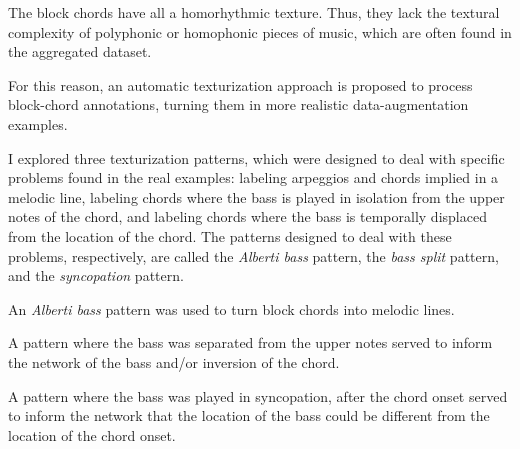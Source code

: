 
The block chords have all a homorhythmic texture. Thus, they
lack the textural complexity of polyphonic or homophonic
pieces of music, which are often found in the aggregated
dataset.

For this reason, an automatic texturization approach is
proposed to process block-chord annotations, turning them in
more realistic data-augmentation examples.

I explored three texturization patterns, which were designed
to deal with specific problems found in the real examples:
labeling arpeggios and chords implied in a melodic line,
labeling chords where the bass is played in isolation from
the upper notes of the chord, and labeling chords where the
bass is temporally displaced from the location of the chord.
The patterns designed to deal with these problems,
respectively, are called the \emph{Alberti bass} pattern,
the \emph{bass split} pattern, and the \emph{syncopation}
pattern.


An \emph{Alberti bass} pattern was used to turn block chords
into melodic lines.


A pattern where the bass was separated from the upper notes
served to inform the network of the bass and/or inversion of
the chord.


A pattern where the bass was played in syncopation, after
the chord onset served to inform the network that the
location of the bass could be different from the location of
the chord onset.
